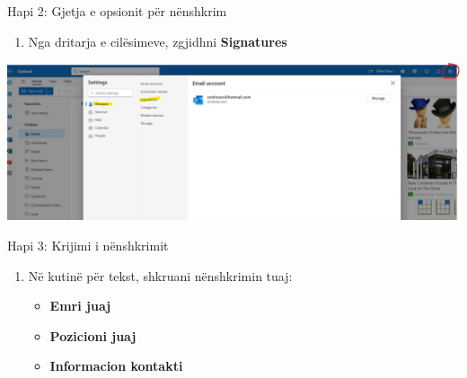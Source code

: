 \documentclass[
  ignorenonframetext,
]{beamer}
\providecommand{\tightlist}{%
  \setlength{\itemsep}{0pt}\setlength{\parskip}{0pt}}
\begin{document}
\begin{frame}{Hapi 2: Gjetja e opsionit për nënshkrim}
\label{hapi-2-gjetja-e-opsionit-puxebr-nuxebnshkrim}
\begin{enumerate}
\tightlist
\item
  Nga dritarja e cilësimeve, zgjidhni \textbf{Signatures}
\end{enumerate}

\includegraphics{./images/outlook7.png}
\end{frame}

\begin{frame}{Hapi 3: Krijimi i nënshkrimit}
\label{hapi-3-krijimi-i-nuxebnshkrimit}
\begin{enumerate}
\item
  Në kutinë për tekst, shkruani nënshkrimin tuaj:

  \begin{itemize}
  \item
    \textbf{Emri juaj}
  \item
    \textbf{Pozicioni juaj}
  \item
    \textbf{Informacion kontakti}
  \end{itemize}
\end{enumerate}
\end{frame}
\end{document}
